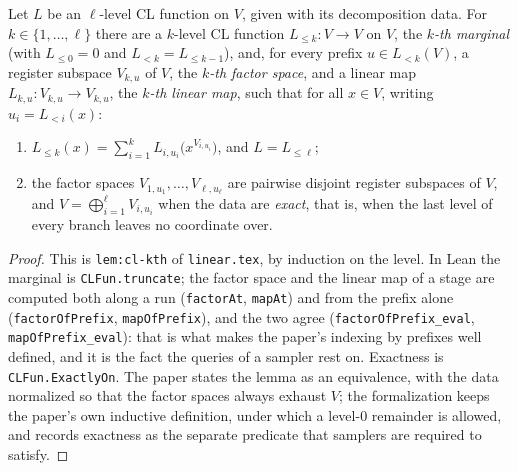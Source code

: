 \begin{lemma}
\label{lem:cl-structure}
\leanok
Let $L$ be an $\ell$-level CL function on $V$, given with its decomposition data. For $k \in
\{1, \ldots, \ell\}$ there are a $k$-level CL function $L_{\leq k} : V \to V$ on $V$, the
\emph{$k$-th marginal} (with $L_{\le 0} = 0$ and $L_{<k} = L_{\le k-1}$), and, for every
prefix $u \in L_{<k}(V)$, a register subspace $V_{k,u}$ of $V$, the \emph{$k$-th factor space},
and a linear map $L_{k,u} : V_{k,u} \to V_{k,u}$, the \emph{$k$-th linear map}, such that for
all $x \in V$, writing $u_i = L_{<i}(x)$:
\begin{enumerate}
\item $L_{\leq k}(x) = \sum_{i=1}^{k} L_{i,u_i}\bigl(x^{V_{i,u_i}}\bigr)$, and
  $L = L_{\le \ell}$;
\item the factor spaces $V_{1,u_1}, \ldots, V_{\ell,u_\ell}$ are pairwise disjoint register
  subspaces of $V$, and $V = \bigoplus_{i=1}^{\ell} V_{i,u_i}$ when the data are
  \emph{exact}, that is, when the last level of every branch leaves no coordinate over.
\end{enumerate}
\end{lemma}

\begin{proof}
\leanok
This is \texttt{lem:cl-kth} of \texttt{linear.tex}, by induction on the level. In Lean the
marginal is \texttt{CLFun.truncate}; the factor space and the linear map of a stage are
computed both along a run (\texttt{factorAt}, \texttt{mapAt}) and from the prefix alone
(\texttt{factorOfPrefix}, \texttt{mapOfPrefix}), and the two agree
(\texttt{factorOfPrefix\_eval}, \texttt{mapOfPrefix\_eval}): that is what makes the paper's
indexing by prefixes well defined, and it is the fact the queries of a sampler rest on.
Exactness is \texttt{CLFun.ExactlyOn}. The paper states the lemma as an equivalence, with the
data normalized so that the factor spaces always exhaust $V$; the formalization keeps the
paper's own inductive definition, under which a level-$0$ remainder is allowed, and records
exactness as the separate predicate that samplers are required to satisfy.
\end{proof}


